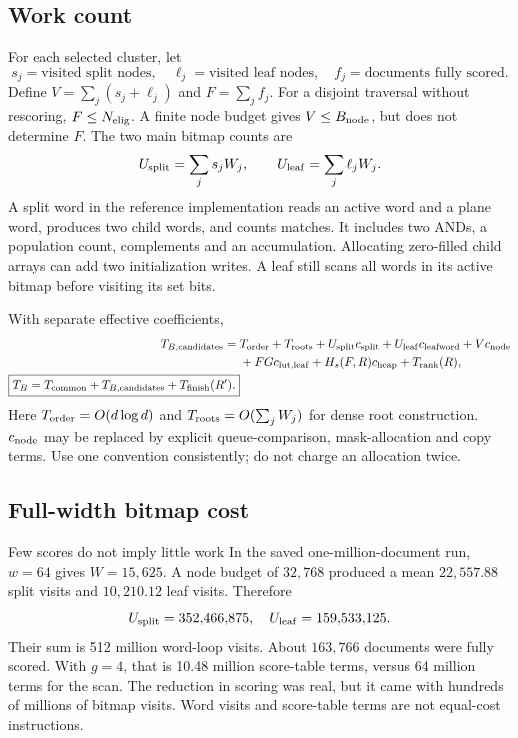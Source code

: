 \subsection{Work count}
For each selected cluster, let
\[
s_j=\text{visited split nodes},\quad
\ell_j=\text{visited leaf nodes},\quad
f_j=\text{documents fully scored}.
\]
Define $V=\sum_j(s_j+\ell_j)$ and $F=\sum_j f_j$. For a disjoint traversal without rescoring,
$F\leq N_{\mathrm{elig}}$. A finite node budget gives $V\leq B_{\rm node}$, but does not determine $F$.
The two main bitmap counts are
\begin{equation}
U_{\rm split}=\sum_j s_j W_j,\qquad
U_{\rm leaf}=\sum_j \ell_j W_j.
\label{eq:bitmap-work}
\end{equation}
A split word in the reference implementation reads an active word and a plane word, produces
two child words, and counts matches. It includes two ANDs, a population count, complements and
an accumulation. Allocating zero-filled child arrays can add two initialization writes.
A leaf still scans all words in its active bitmap before visiting its set bits.

With separate effective coefficients,
\begin{align}
T_{B,\rm candidates}={}&T_{\rm order}+T_{\rm roots}
 +U_{\rm split}c_{\rm split}+U_{\rm leaf}c_{\rm leafword}
 +V c_{\rm node} \notag\\
 &+F G c_{\rm lut,leaf}+H_s(F,R)c_{\rm heap}+T_{\rm rank}(R),
\label{eq:branch-time}\\
\boxed{T_B=T_{\mathrm{common}}+T_{B,\rm candidates}+T_{\mathrm{finish}}(R').}
\end{align}
Here $T_{\rm order}=O(d\log d)$ and $T_{\rm roots}=O(\sum_jW_j)$ for dense root construction.
$c_{\rm node}$ may be replaced by explicit queue-comparison, mask-allocation and copy terms.
Use one convention consistently; do not charge an allocation twice.

\subsection{Full-width bitmap cost}
\begin{examplebox}{Few scores do not imply little work}
In the saved one-million-document run, $w=64$ gives $W=15{,}625$. A node budget of $32{,}768$
produced a mean $22{,}557.88$ split visits and $10{,}210.12$ leaf visits. Therefore
\[
U_{\rm split}=352{,}466{,}875,\quad U_{\rm leaf}=159{,}533{,}125.
\]
Their sum is 512 million word-loop visits. About $163{,}766$ documents were fully scored.
With $g=4$, that is 10.48 million score-table terms, versus 64 million terms for the scan.
The reduction in scoring was real, but it came with hundreds of millions of bitmap visits.
Word visits and score-table terms are not equal-cost instructions.
\end{examplebox}


